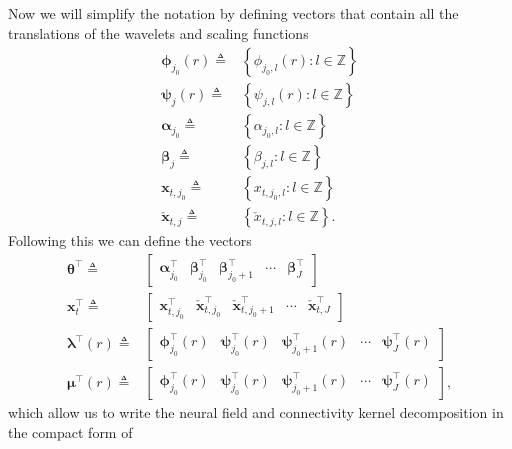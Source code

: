 \documentclass[review,authoryear,3p]{elsarticle}
\begin{document}
Now we will simplify the notation by defining vectors that contain all the translations of the wavelets and scaling functions 
\begin{align}      
	\boldsymbol\phi_{j_0}(r) \triangleq&\left\lbrace{\phi_{j_0,l}(r)}:l \in \mathbb{Z} \right\rbrace \\
	\boldsymbol\psi_{j}(r) \triangleq& \left\lbrace{\psi_{j,l}(r)}:l \in \mathbb{Z} \right\rbrace\\
	\boldsymbol\alpha_{j_0} \triangleq& \left\lbrace\alpha_{j_0, l}:l \in \mathbb{Z} \right\rbrace \\
	\boldsymbol\beta_{j} \triangleq& \left\lbrace\beta_{j, l}:l \in \mathbb{Z} \right\rbrace \\
	\mathbf{x}_{t,j_0} \triangleq& \left\lbrace{x}_{t,j_{0},l}:l \in \mathbb{Z} \right\rbrace \\
	\check{\mathbf{x}}_{t,j} \triangleq& \left\lbrace{\check{x}}_{t,j,l}:l \in \mathbb{Z} \right\rbrace.
\end{align}
Following this we can define the vectors 
\begin{align}
\boldsymbol\theta^\top \triangleq& [\begin{array}{ccccc} \boldsymbol\alpha_{j_0}^\top & \boldsymbol\beta_{j_0}^\top & \boldsymbol\beta_{j_0+1}^\top & \cdots & \boldsymbol\beta_{J}^\top \end{array}] 
\label{KernelWeights} \\
\mathbf{x}_{t}^\top \triangleq& [\begin{array}{ccccc}\mathbf{x}_{t,j_{0}}^\top &  \check{\mathbf{x}}_{t,j_{0}}^\top & \check{\mathbf{x}}_{t,j_{0}+1}^\top & \cdots & \check{\mathbf{x}}_{t,J}^\top\end{array}]
\label{FieldWeights} \\
\label{KernelBasisVector}
\boldsymbol\lambda^\top(r) \triangleq& \left[
\begin{array}{ccccc} \boldsymbol\phi_{j_0}^\top(r) &
\boldsymbol\psi_{j_0}^\top(r) & 
\boldsymbol\psi_{j_0+1}^\top(r) &
\cdots &
\boldsymbol\psi_{J}^\top(r)\end{array}\right] \\
\label{FieldBasisVector}
\boldsymbol\mu^\top (r) \triangleq& \left[
\begin{array}{ccccc}\boldsymbol\phi_{j_0}^\top(r) &
\boldsymbol\psi_{j_0}^\top(r) & 
\boldsymbol\psi_{j_0+1}^\top(r) &
\cdots &
\boldsymbol\psi_{J}^\top(r)\end{array}\right],
\end{align}
which allow us to write the neural field and connectivity kernel decomposition in the compact form of
\end{document}
